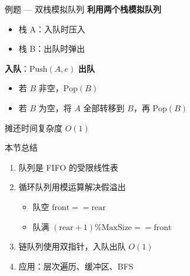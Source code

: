 \documentclass[10pt, aspectratio=169]{beamer}
\begin{document}
\begin{frame}{例题 --- 双栈模拟队列}
    \textbf{利用两个栈模拟队列}
    \vspace{0.5em}
    \begin{itemize}
        \item 栈 A：入队时压入
        \item 栈 B：出队时弹出
    \end{itemize}
    \vspace{0.3em}
    \textbf{入队}：$\text{Push}(A, e)$
    \vspace{0.3em}
    \textbf{出队}
    \begin{itemize}
        \item 若 $B$ 非空，$\text{Pop}(B)$
        \item 若 $B$ 为空，将 $A$ 全部转移到 $B$，再 $\text{Pop}(B)$
    \end{itemize}
    \vspace{0.3em}
    摊还时间复杂度 $O(1)$
\end{frame}

\begin{frame}{本节总结}
    \begin{enumerate}
        \item 队列是 FIFO 的受限线性表
        \item 循环队列用模运算解决假溢出
        \begin{itemize}
            \item 队空 $\text{front} == \text{rear}$
            \item 队满 $(\text{rear}+1)\% \text{MaxSize} == \text{front}$
        \end{itemize}
        \item 链队列使用双指针，入队出队 $O(1)$
        \item 应用：层次遍历、缓冲区、BFS
    \end{enumerate}
\end{frame}
\end{document}
